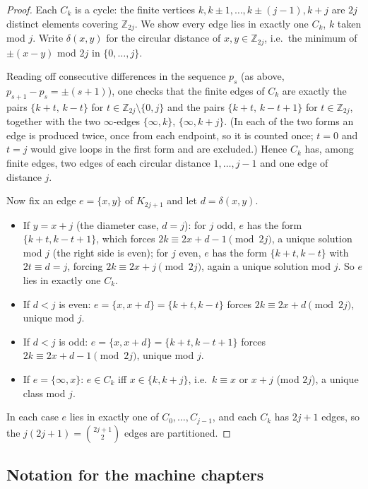 \begin{proof}
Each $C_k$ is a cycle: the finite vertices $k, k\pm1,\dots,k\pm(j-1),k+j$ are $2j$ distinct
elements covering $\mathbb{Z}_{2j}$. We show every edge lies in exactly one $C_k$, $k$ taken
mod $j$. Write $\delta(x,y)$ for the circular distance of $x,y\in\mathbb{Z}_{2j}$, i.e.\ the
minimum of $\pm(x-y)$ mod $2j$ in $\{0,\dots,j\}$.

Reading off consecutive differences in the sequence $p_s$ (as above,
$p_{s+1}-p_s=\pm(s+1)$), one checks that the finite edges of $C_k$ are exactly the pairs
$\{k+t,\,k-t\}$ for $t\in\mathbb{Z}_{2j}\setminus\{0,j\}$ and the pairs
$\{k+t,\,k-t+1\}$ for $t\in\mathbb{Z}_{2j}$, together with the two $\infty$-edges
$\{\infty,k\}$, $\{\infty,k+j\}$. (In each of the two forms an edge is produced twice, once
from each endpoint, so it is counted once; $t=0$ and $t=j$ would give loops in the first
form and are excluded.) Hence $C_k$ has, among finite edges, two edges of each circular
distance $1,\dots,j-1$ and one edge of distance $j$.

Now fix an edge $e=\{x,y\}$ of $K_{2j+1}$ and let $d=\delta(x,y)$.
\begin{itemize}[leftmargin=1.5em]
\item If $y=x+j$ (the diameter case, $d=j$): for $j$ odd, $e$ has the form
$\{k+t,k-t+1\}$, which forces $2k\equiv 2x+d-1\pmod{2j}$, a unique solution mod $j$ (the
right side is even); for $j$ even, $e$ has the form $\{k+t,k-t\}$ with $2t\equiv d=j$,
forcing $2k\equiv 2x+j\pmod{2j}$, again a unique solution mod $j$. So $e$ lies in exactly
one $C_k$.
\item If $d<j$ is even: $e=\{x,x+d\}=\{k+t,k-t\}$ forces $2k\equiv 2x+d\pmod{2j}$, unique
mod $j$.
\item If $d<j$ is odd: $e=\{x,x+d\}=\{k+t,k-t+1\}$ forces $2k\equiv 2x+d-1\pmod{2j}$,
unique mod $j$.
\item If $e=\{\infty,x\}$: $e\in C_k$ iff $x\in\{k,k+j\}$, i.e.\ $k\equiv x$ or $x+j$
(mod $2j$), a unique class mod $j$.
\end{itemize}
In each case $e$ lies in exactly one of $C_0,\dots,C_{j-1}$, and each $C_k$ has $2j+1$
edges, so the $j(2j+1)=\binom{2j+1}{2}$ edges are partitioned.
\end{proof}

\subsection{Notation for the machine chapters}\label{int:subsec-machnotation}


